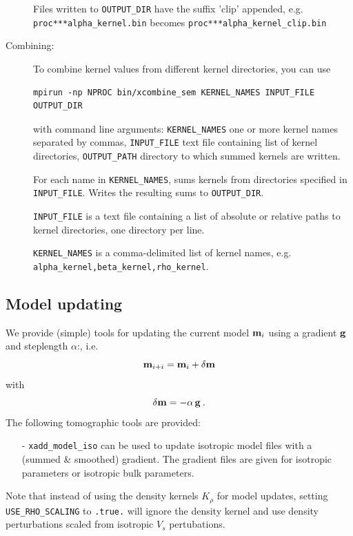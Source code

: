 \begin{description}
Files written to \texttt{OUTPUT\_DIR} have the suffix 'clip' appended,
e.g. \texttt{proc***alpha\_kernel.bin} becomes \texttt{proc***alpha\_kernel\_clip.bin}

\item [Combining:] To combine kernel values from different kernel directories, you can use
\begin{verbatim}
mpirun -np NPROC bin/xcombine_sem KERNEL_NAMES INPUT_FILE OUTPUT_DIR
\end{verbatim}
with command line arguments:
\texttt{KERNEL\_NAMES} one or more kernel names separated by commas,
\texttt{INPUT\_FILE} text file containing list of kernel directories,
\texttt{OUTPUT\_PATH} directory to which summed kernels are written.

For each name in \texttt{KERNEL\_NAMES}, sums kernels from directories specified in
\texttt{INPUT\_FILE}. Writes the resulting sums to \texttt{OUTPUT\_DIR}.

\texttt{INPUT\_FILE} is a text file containing a list of absolute or relative paths to
kernel directories, one directory per line.

\texttt{KERNEL\_NAMES} is a comma-delimited list of kernel names,
e.g. \texttt{alpha\_kernel,beta\_kernel,rho\_kernel}.



\end{description}

\subsection{Model updating}
We provide (simple) tools for updating the current model $\mathbf{m}_i$ using a gradient $\mathbf{g}$ and steplength $\alpha$:, i.e.
\begin{equation}
\mathbf{m}_{i+i} = \mathbf{m}_i + \delta \mathbf{m}  \nonumber
\end{equation}
with
\begin{equation}
\delta \mathbf{m} = - \alpha \, \mathbf{g} \nonumber \: .
\end{equation}
\noindent
The following tomographic tools are provided:
\begin{enumerate}
\item [-] \texttt{xadd\_model\_iso} can be used to update isotropic model files with a (summed \& smoothed) gradient.
The gradient files are given for isotropic parameters or isotropic bulk parameters.

\end{enumerate}

Note that instead of using the density kernels $K_{\rho}$ for model updates, setting \texttt{USE\_RHO\_SCALING} to \texttt{.true.} will
ignore the density kernel and use density perturbations scaled from isotropic $V_s$ pertubations.\\

